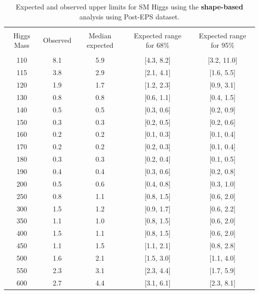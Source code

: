 \begin{table}[hbp!]
\begin{center}
\begin{tabular}{c c c c c}
\hline
\vspace{-3mm} && \\
 Higgs Mass   & Observed & Median expected & Expected range for 68\% & Expected range for 95\%   \\
\vspace{-3mm} && \\
\hline
110 & 8.1 & 5.9 & [4.3, 8.2] & [3.2, 11.0] \\
115 & 3.8 & 2.9 & [2.1, 4.1] & [1.6, 5.5] \\
120 & 1.9 & 1.7 & [1.2, 2.3] & [0.9, 3.1] \\
130 & 0.8 & 0.8 & [0.6, 1.1] & [0.4, 1.5] \\
140 & 0.5 & 0.5 & [0.3, 0.6] & [0.2, 0.9] \\
150 & 0.3 & 0.3 & [0.2, 0.5] & [0.2, 0.6] \\
160 & 0.2 & 0.2 & [0.1, 0.3] & [0.1, 0.4] \\
170 & 0.2 & 0.2 & [0.2, 0.3] & [0.1, 0.4] \\
180 & 0.3 & 0.3 & [0.2, 0.4] & [0.1, 0.5] \\
190 & 0.4 & 0.4 & [0.3, 0.6] & [0.2, 0.8] \\
200 & 0.5 & 0.6 & [0.4, 0.8] & [0.3, 1.0] \\
250 & 0.8 & 1.1 & [0.8, 1.5] & [0.6, 2.0] \\
300 & 1.5 & 1.2 & [0.9, 1.7] & [0.6, 2.2] \\
350 & 1.1 & 1.0 & [0.8, 1.5] & [0.6, 2.0] \\
400 & 1.5 & 1.1 & [0.8, 1.5] & [0.6, 2.0] \\
450 & 1.1 & 1.5 & [1.1, 2.1] & [0.8, 2.8] \\
500 & 1.6 & 2.1 & [1.5, 3.0] & [1.1, 4.0] \\
550 & 2.3 & 3.1 & [2.3, 4.4] & [1.7, 5.9] \\
600 & 2.7 & 4.4 & [3.1, 6.1] & [2.3, 8.1] \\
\hline
\end{tabular}
\caption{Expected and observed upper limits for SM Higgs using the
  {\bf shape-based} analysis using Post-EPS dataset.}
\label{tab:mvabase_uls_posteps}
\end{center}
\end{table}

